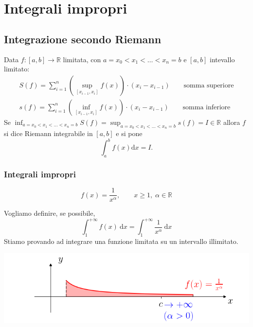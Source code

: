 \section{Integrali impropri}
\subsection{Integrazione secondo Riemann}

Data $f:[a,b] \rightarrow \mathbb{R}$ limitata, con $a=x_0 < x_1 < \ldots < x_n =b$ e $[a,b]$ intevallo limitato:
\begin{gather*}
	S(f) =\sum_{i=1}^{n} \left( \sup_{[x_{i-1},x_i]} f(x) \right) \cdot (x_i-x_{i-1}) \qquad \text{somma superiore}
	\\
	s(f) =\sum_{i=1}^{n} \left(\inf_{[x_{i-1},x_i]} f(x)\right)\cdot (x_i-x_{i-1}) \qquad \text{somma inferiore}
\end{gather*}
Se $\inf_{a=x_0 < x_1 < ... < x_n =b} S(f) = \sup_{a=x_0 < x_1 < ... < x_n =b} s(f) =I \in \mathbb{R}$ allora $f$ si dice Riemann integrabile in $[a,b]$ e si pone 
\begin{equation*}
	\int_{a}^{b} f(x) \mathrm{d}x=I.
\end{equation*}


\subsubsection{Integrali impropri}
\begin{exbar}
\begin{example}
	\begin{equation*}
		f(x)=\frac{1}{x^\alpha}, \qquad x \geq 1, \; \alpha \in \mathbb{R}
	\end{equation*}
	
	Vogliamo definire, se possibile, 
	\begin{equation*}
		\int_{1}^{+\infty} f(x) \ \mathrm{d}x= \int_{1}^{+\infty}\frac{1}{x^\alpha} \ \mathrm{d}x
	\end{equation*}
	Stiamo provando ad integrare una funzione limitata su un intervallo illimitato.
	\begin{center}
		\includegraphics[width=\linewidth]{integrali_impropri/pag77}
		\label{fig:pag77}
	\end{center}

	

\end{example}


\end{exbar}



